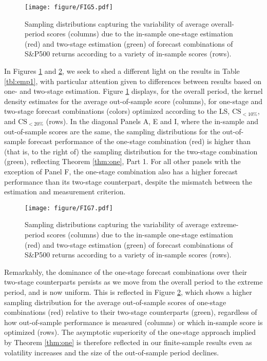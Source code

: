 \documentclass[12pt]{article}
\theoremstyle{definition}
\theoremstyle{remark}
\begin{document}
\begin{figure}[t]
\texttt{[image: figure/FIG5.pdf]}
\caption{Sampling distributions capturing the variability of average overall-period scores (columns) due to the in-sample one-stage estimation (red) and two-stage estimation (green) of forecast combinations of S\&P500 returns according to a variety of in-sample scores (rows).}
\label{fig:emp2}
\end{figure}

In Figures \ref{fig:emp2} and \ref{fig:emp4}, we seek to shed a different light on the results in Table \ref{tbl:emp1}, with particular attention given to differences between results based on one- and two-stage estimation. Figure \ref{fig:emp2} displays, for the overall period, the kernel density estimates for the average out-of-sample score (columns), for one-stage and two-stage forecast combinations (colors) optimized according to the LS, $\mathrm{CS}_{<10\%}$, and $\mathrm{CS}_{<20\%}$ (rows). In the diagonal Panels A, E and I, where the in-sample and out-of-sample scores are the same, the sampling distributions for the out-of-sample forecast performance of the one-stage combination (red) is higher than (that is, to the right of) the sampling distribution for the two-stage combination (green), reflecting Theorem \ref{thm:one}, Part 1. For all other panels with the exception of Panel F, the one-stage combination also has a higher forecast performance than its two-stage counterpart, despite the mismatch between the estimation and measurement criterion.

\begin{figure}[t]
\texttt{[image: figure/FIG7.pdf]}
\caption{Sampling distributions capturing the variability of average extreme-period scores (columns) due to the in-sample one-stage estimation (red) and two-stage estimation (green) of forecast combinations of S\&P500 returns according to a variety of in-sample scores (rows).}
\label{fig:emp4}
\end{figure}

Remarkably, the dominance of the one-stage forecast combinations over their two-stage counterparts persists as we move from the overall period to the extreme period, and is now uniform. This is reflected in Figure \ref{fig:emp4}, which shows a higher sampling distribution for the average out-of-sample scores of one-stage combinations (red) relative to their two-stage counterparts (green), regardless of how out-of-sample performance is measured (columns) or which in-sample score is optimized (rows). The asymptotic superiority of the one-stage approach implied by Theorem \ref{thm:one} is therefore reflected in our finite-sample results even as volatility increases and the size of the out-of-sample period declines.
\end{document}
